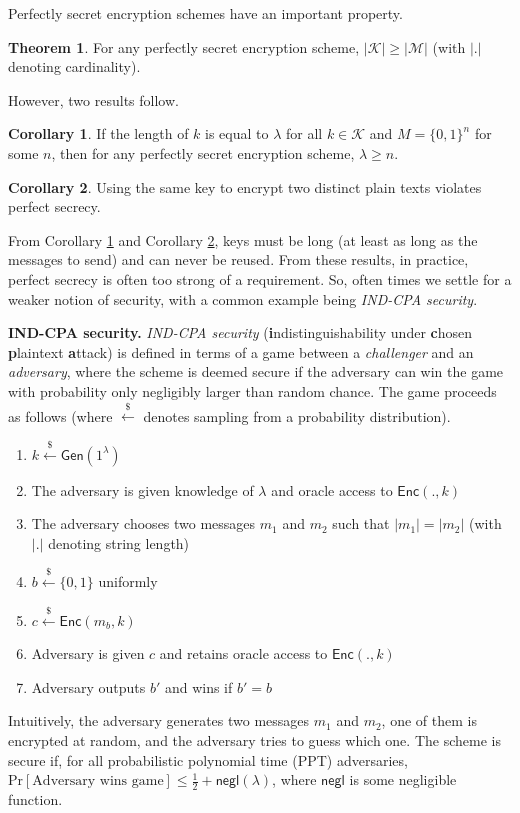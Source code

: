 \documentclass{article}
\theoremstyle{definition}
\newtheorem{theorem}{Theorem}
\newtheorem{corollary}{Corollary}
\begin{document}
Perfectly secret encryption schemes have an important property.

\begin{theorem}
For any perfectly secret encryption scheme, $|\mathcal{K}| \geq |\mathcal{M}|$ (with $|.|$ denoting cardinality).
\end{theorem}

However, two results follow.

\begin{corollary}\label{cor:ps}
If the length of $k$ is equal to $\lambda$ for all $k \in \mathcal{K}$ and $M = \{0,1\}^n$ for some $n$, 
then for any perfectly secret encryption scheme, $\lambda \geq n$. 
\end{corollary}

\begin{corollary}\label{cor:ps_2}
Using the same key to encrypt two distinct plain texts violates perfect secrecy.
\end{corollary}

 From Corollary \ref{cor:ps} and Corollary \ref{cor:ps_2}, 
 keys must be long (at least as long as the messages to send) and can never be reused. 
 From these results, in practice, perfect secrecy is often too strong of a requirement. 
 So, often times we settle for a weaker notion of security, with a common example being \textit{IND-CPA security}.

\textbf{IND-CPA security.} \textit{IND-CPA security} (\textbf{i}ndistinguishability under 
\textbf{c}hosen \textbf{p}laintext \textbf{a}ttack) is defined in terms of a game between a 
\textit{challenger} and an \textit{adversary}, where the scheme is deemed secure if the adversary 
can win the game with probability only negligibly larger than random chance. 
The game proceeds as follows (where $\xleftarrow{\$}$ denotes sampling from a probability distribution).

\begin{enumerate}
    \item $k \xleftarrow{\$} \mathsf{Gen}(1^\lambda)$
    \item The adversary is given knowledge of $\lambda$ and oracle access to $\mathsf{Enc}(., k)$
    \item The adversary chooses two messages $m_1$
 and $m_2$ such that $|m_1| = |m_2|$ (with $|.|$ denoting string length)
    \item $b \xleftarrow{\$} \{0, 1\}$ uniformly
    \item $c \xleftarrow{\$} \mathsf{Enc}(m_b,k)$
    \item Adversary is given $c$ and retains oracle access to $\mathsf{Enc}(., k)$
    \item Adversary outputs $b'$ and wins if $b' = b$
 \end{enumerate}
 Intuitively, the adversary generates two messages $m_1$ and $m_2$, one of them is encrypted at random, 
 and the adversary tries to guess which one. The scheme is secure if, for all probabilistic polynomial time (PPT) adversaries, 
 $\text{Pr}[\text{Adversary wins game}] \leq \frac{1}{2} + \textsf{negl}(\lambda)$, where $\textsf{negl}$ 
 is some negligible function.
\end{document}
